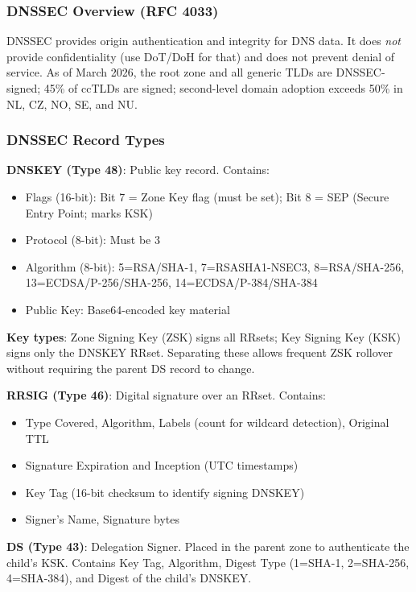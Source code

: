 \documentclass[11pt,letterpaper]{article}
\begin{document}
\subsubsection{DNSSEC Overview (RFC 4033)}

DNSSEC provides origin authentication and integrity for DNS data. It does \emph{not} provide confidentiality (use DoT/DoH for that) and does not prevent denial of service. As of March 2026, the root zone and all generic TLDs are DNSSEC-signed; 45\% of ccTLDs are signed; second-level domain adoption exceeds 50\% in NL, CZ, NO, SE, and NU.

\subsubsection{DNSSEC Record Types}

\textbf{DNSKEY (Type 48)}: Public key record. Contains:
\begin{itemize}
  \item Flags (16-bit): Bit 7 = Zone Key flag (must be set); Bit 8 = SEP (Secure Entry Point; marks KSK)
  \item Protocol (8-bit): Must be 3
  \item Algorithm (8-bit): 5=RSA/SHA-1, 7=RSASHA1-NSEC3, 8=RSA/SHA-256, 13=ECDSA/P-256/SHA-256, 14=ECDSA/P-384/SHA-384
  \item Public Key: Base64-encoded key material
\end{itemize}

\textbf{Key types}: Zone Signing Key (ZSK) signs all RRsets; Key Signing Key (KSK) signs only the DNSKEY RRset. Separating these allows frequent ZSK rollover without requiring the parent DS record to change.

\textbf{RRSIG (Type 46)}: Digital signature over an RRset. Contains:
\begin{itemize}
  \item Type Covered, Algorithm, Labels (count for wildcard detection), Original TTL
  \item Signature Expiration and Inception (UTC timestamps)
  \item Key Tag (16-bit checksum to identify signing DNSKEY)
  \item Signer's Name, Signature bytes
\end{itemize}

\textbf{DS (Type 43)}: Delegation Signer. Placed in the parent zone to authenticate the child's KSK. Contains Key Tag, Algorithm, Digest Type (1=SHA-1, 2=SHA-256, 4=SHA-384), and Digest of the child's DNSKEY.
\end{document}
